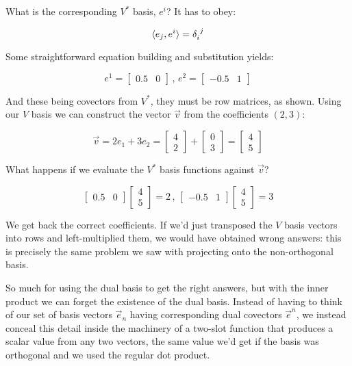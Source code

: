 What is the corresponding $V^*$ basis, $e^i$? It has to obey:

$$
\langle e_j,e^i \rangle = \delta \indices{_i^j}
$$

Some straightforward equation building and substitution yields:

$$
e^1 = \begin{bmatrix}0.5 & 0\end{bmatrix}\,,\,
e^2 = \begin{bmatrix}-0.5 & 1\end{bmatrix}
$$

And these being covectors from $V^*$, they must be row matrices, as shown. Using our $V$ basis we can construct the vector $\vec{v}$ from the coefficients $(2, 3)$:

$$
\vec{v} = 2e_1 + 3e_2
        = \begin{bmatrix}4 \\ 2\end{bmatrix} + \begin{bmatrix}0 \\ 3\end{bmatrix} 
        = \begin{bmatrix}4 \\ 5\end{bmatrix}
$$

What happens if we evaluate the $V^*$ basis functions against $\vec{v}$?

$$
\begin{bmatrix}0.5 & 0\end{bmatrix} \begin{bmatrix}4 \\ 5\end{bmatrix} = 2 
\,,\,
\begin{bmatrix}-0.5 & 1\end{bmatrix} \begin{bmatrix}4 \\ 5\end{bmatrix} = 3
$$

We get back the correct coefficients. If we'd just transposed the $V$ basis vectors into rows and left-multiplied them, we would have obtained wrong answers: this is precisely the same problem we saw with projecting onto the non-orthogonal basis.

So much for using the dual basis to get the right answers, but with the inner product we can forget the existence of the dual basis. Instead of having to think of our set of basis vectors $\vec{e}_n$ having corresponding dual covectors $\vec{e}^n$, we instead conceal this detail inside the machinery of a two-slot function that produces a scalar value from any two vectors, the same value we'd get if the basis was orthogonal and we used the regular dot product.

